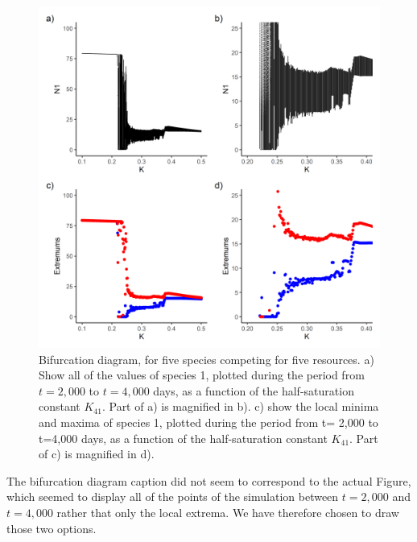 \begin{figure}[H]
\begin{center} 
 \includegraphics[width=1\textwidth]{../Code/Figures/Figure_3.png}
  \caption{Bifurcation diagram, for five species competing for five resources. a) Show all of the values of species 1, plotted during the period from $t=2,000$ to $t=4,000$ days, as a function of the half-saturation constant $K_{41}$. Part of a) is magnified in b). c) show the local minima and maxima of species 1, plotted during the period from t= 2,000 to t=4,000 days, as a function of the half-saturation constant $K_{41}$. Part of c) is magnified in d).}
  \label{figures:Fig3}
\end{center}
\end{figure}

The bifurcation diagram caption did not seem to correspond to the actual Figure, which seemed to display all of the points of the simulation between $t=2,000$ and $t=4,000$ rather that only the local extrema. We have therefore chosen to draw those two options. 

